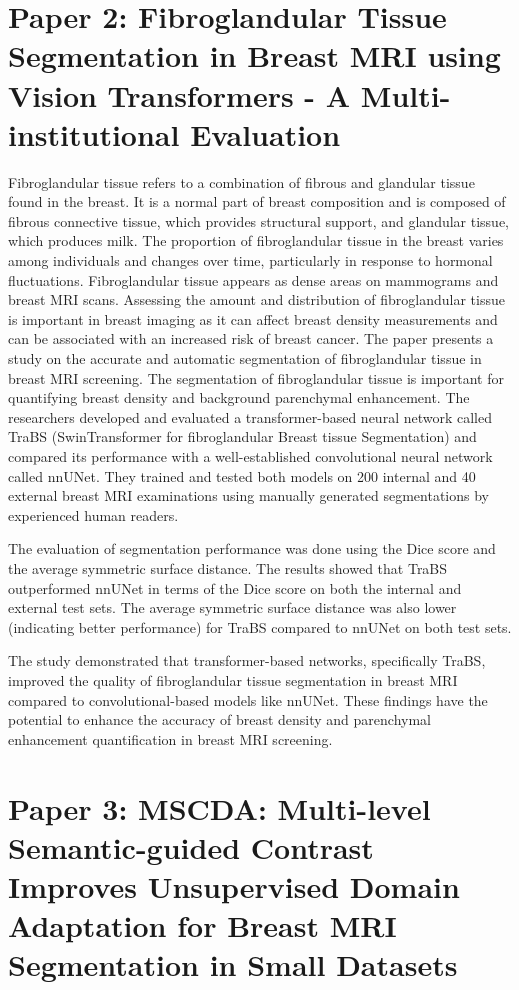 \documentclass{article}
\begin{document}
\section{Paper 2: Fibroglandular Tissue Segmentation in Breast MRI using Vision Transformers - A Multi-institutional Evaluation}
Fibroglandular tissue refers to a combination of fibrous and glandular tissue found in the breast. It is a normal part of breast composition and is composed of fibrous connective tissue, which provides structural support, and glandular tissue, which produces milk. The proportion of fibroglandular tissue in the breast varies among individuals and changes over time, particularly in response to hormonal fluctuations. Fibroglandular tissue appears as dense areas on mammograms and breast MRI scans. Assessing the amount and distribution of fibroglandular tissue is important in breast imaging as it can affect breast density measurements and can be associated with an increased risk of breast cancer.
The paper  presents a study on the accurate and automatic segmentation of fibroglandular tissue in breast MRI screening. The segmentation of fibroglandular tissue is important for quantifying breast density and background parenchymal enhancement.
The researchers developed and evaluated a transformer-based neural network called TraBS (SwinTransformer for fibroglandular Breast tissue Segmentation) and compared its performance with a well-established convolutional neural network called nnUNet. They trained and tested both models on 200 internal and 40 external breast MRI examinations using manually generated segmentations by experienced human readers.

The evaluation of segmentation performance was done using the Dice score and the average symmetric surface distance. The results showed that TraBS outperformed nnUNet in terms of the Dice score on both the internal and external test sets. The average symmetric surface distance was also lower (indicating better performance) for TraBS compared to nnUNet on both test sets.

The study demonstrated that transformer-based networks, specifically TraBS, improved the quality of fibroglandular tissue segmentation in breast MRI compared to convolutional-based models like nnUNet. These findings have the potential to enhance the accuracy of breast density and parenchymal enhancement quantification in breast MRI screening.

\section{Paper 3: MSCDA: Multi-level Semantic-guided Contrast Improves
Unsupervised Domain Adaptation for Breast MRI
Segmentation in Small Datasets}
\end{document}
